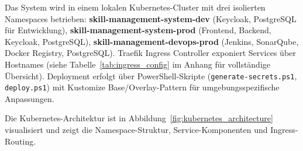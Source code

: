 Das System wird in einem lokalen Kubernetes-Cluster mit drei isolierten Namespaces betrieben: \textbf{skill-management-system-dev} (Keycloak, PostgreSQL für Entwicklung), \textbf{skill-management-system-prod} (Frontend, Backend, Keycloak, PostgreSQL), \textbf{skill-management-devops-prod} (Jenkins, SonarQube, Docker Registry, PostgreSQL). Traefik Ingress Controller exponiert Services über Hostnames (siehe Tabelle~\ref{tab:ingress_config} im Anhang für vollständige Übersicht). Deployment erfolgt über PowerShell-Skripte (\texttt{generate-secrets.ps1}, \texttt{deploy.ps1}) mit Kustomize Base/Overlay-Pattern für umgebungsspezifische Anpassungen.

Die Kubernetes-Architektur ist in Abbildung~\ref{fig:kubernetes_architecture} visualisiert und zeigt die Namespace-Struktur, Service-Komponenten und Ingress-Routing.

